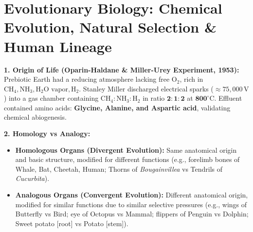 \documentclass[10pt,twoside,openright]{book}
\begin{document}
\section{Evolutionary Biology: Chemical Evolution, Natural Selection \& Human Lineage}

\begin{conceptbox}
\textbf{1. Origin of Life (Oparin-Haldane \& Miller-Urey Experiment, 1953):}
Prebiotic Earth had a reducing atmosphere lacking free $\mathrm{O}_2$, rich in $\mathrm{CH_4, NH_3, H_2O\text{ vapor}, H_2}$. Stanley Miller discharged electrical sparks ($\approx 75,000\,\mathrm{V}$) into a gas chamber containing $\mathbf{\mathrm{CH_4 : NH_3 : H_2}}$ in ratio $\mathbf{2 : 1 : 2}$ at $\mathbf{800^\circ\mathrm{C}}$. Effluent contained amino acids: \textbf{Glycine, Alanine, and Aspartic acid}, validating chemical abiogenesis.

\textbf{2. Homology vs Analogy:}
\begin{itemize}
  \item \textbf{Homologous Organs (Divergent Evolution):} Same anatomical origin and basic structure, modified for different functions (e.g., forelimb bones of Whale, Bat, Cheetah, Human; Thorns of \textit{Bougainvillea} vs Tendrils of \textit{Cucurbita}).
  \item \textbf{Analogous Organs (Convergent Evolution):} Different anatomical origin, modified for similar functions due to similar selective pressures (e.g., wings of Butterfly vs Bird; eye of Octopus vs Mammal; flippers of Penguin vs Dolphin; Sweet potato [root] vs Potato [stem]).
\end{itemize}


\end{conceptbox}
\end{document}
